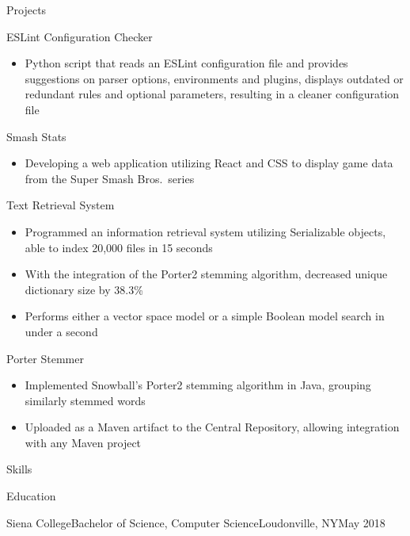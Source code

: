 \documentclass[]{xjavathehutt}
\begin{document}
\begin{cvsection}{Projects}
  \begin{cvprojectstart}{ESLint Configuration Checker}
    \begin{itemize}
      \item{Python script that reads an ESLint configuration file and provides suggestions on parser
        options, environments and plugins, displays outdated or redundant rules and optional
        parameters, resulting in a cleaner configuration file}
    \end{itemize}
  \end{cvprojectstart}

  \begin{cvproject}{Smash Stats}
    \begin{itemize}
      \item{Developing a web application utilizing React and CSS to display game data from the
          Super Smash Bros.\ series}
    \end{itemize}
  \end{cvproject}

  \begin{cvproject}{Text Retrieval System}
    \begin{itemize}
      \item{Programmed an information retrieval system utilizing Serializable objects, able to index 20,000 files in 15 seconds}
      \item{With the integration of the Porter2 stemming algorithm, decreased unique dictionary size by 38.3\%}
      \item{Performs either a vector space model or a simple Boolean model search in under a second}
    \end{itemize}
  \end{cvproject}

  \begin{cvproject}{Porter Stemmer}
    \begin{itemize}
      \item{Implemented Snowball's Porter2 stemming algorithm in Java, grouping similarly stemmed words}
      \item{Uploaded as a Maven artifact to the Central Repository, allowing integration with any Maven project}
    \end{itemize}
  \end{cvproject}
\end{cvsection}


\begin{cvsection}{Skills}
  \printskills
\end{cvsection}


\begin{cvsection}{Education}
  \begin{cvsubsectionstart}{Siena College}{Bachelor of Science, Computer Science}{Loudonville, NY}{May 2018}
  \end{cvsubsectionstart}
\end{cvsection}


\end{document}
